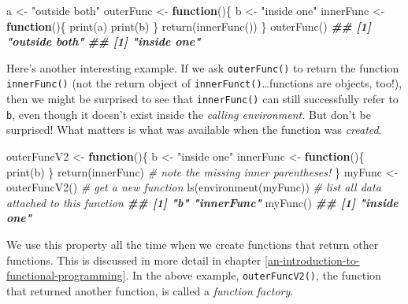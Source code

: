\documentclass[
  12pt,
  krantz2]{krantz}
\makeatletter
\newenvironment{Shaded}{\begin{snugshade}}{\end{snugshade}}
\newcommand{\CommentTok}[1]{\textcolor[rgb]{0.37,0.37,0.37}{\textit{#1}}}
\newcommand{\ControlFlowTok}[1]{\textcolor[rgb]{0.27,0.27,0.27}{\textbf{#1}}}
\newcommand{\DocumentationTok}[1]{\textcolor[rgb]{0.37,0.37,0.37}{\textbf{\textit{#1}}}}
\newcommand{\FunctionTok}[1]{\textcolor[rgb]{0,0,0}{#1}}
\newcommand{\NormalTok}[1]{#1}
\newcommand{\OtherTok}[1]{\textcolor[rgb]{0.37,0.37,0.37}{#1}}
\newcommand{\StringTok}[1]{\textcolor[rgb]{0.5,0.5,0.5}{#1}}
\newenvironment{kframe}{%
\medskip{}
\setlength{\fboxsep}{.8em}
 \def\at@end@of@kframe{}%
 \ifinner\ifhmode%
  \def\at@end@of@kframe{\end{minipage}}%
  \begin{minipage}{\columnwidth}%
 \fi\fi%
 \def\FrameCommand##1{\hskip\@totalleftmargin \hskip-\fboxsep
 \colorbox{shadecolor}{##1}\hskip-\fboxsep
     \hskip-\linewidth \hskip-\@totalleftmargin \hskip\columnwidth}%
 \MakeFramed {\advance\hsize-\width
   \@totalleftmargin\z@ \linewidth\hsize
   \@setminipage}}%
 {\par\unskip\endMakeFramed%
 \at@end@of@kframe}
\renewenvironment{Shaded}{\begin{kframe}}{\end{kframe}}
\makeatother
\begin{document}
\begin{Shaded}
\begin{Highlighting}[]
\NormalTok{a }\OtherTok{\textless{}{-}} \StringTok{"outside both"}
\NormalTok{outerFunc }\OtherTok{\textless{}{-}} \ControlFlowTok{function}\NormalTok{()\{}
\NormalTok{  b }\OtherTok{\textless{}{-}} \StringTok{"inside one"}
\NormalTok{  innerFunc }\OtherTok{\textless{}{-}} \ControlFlowTok{function}\NormalTok{()\{}
    \FunctionTok{print}\NormalTok{(a) }
    \FunctionTok{print}\NormalTok{(b)}
\NormalTok{  \}}
  \FunctionTok{return}\NormalTok{(}\FunctionTok{innerFunc}\NormalTok{())}
\NormalTok{\}}
\FunctionTok{outerFunc}\NormalTok{()}
\DocumentationTok{\#\# [1] "outside both"}
\DocumentationTok{\#\# [1] "inside one"}
\end{Highlighting}
\end{Shaded}

Here's another interesting example. If we ask \texttt{outerFunc()} to return the function \texttt{innerFunc()} (not the return object of \texttt{innerFunct()}\ldots functions are objects, too!), then we might be surprised to see that \texttt{innerFunc()} can still successfully refer to \texttt{b}, even though it doesn't exist inside the \emph{calling environment.} But don't be surprised! What matters is what was available when the function was \emph{created}.

\begin{Shaded}
\begin{Highlighting}[]
\NormalTok{outerFuncV2 }\OtherTok{\textless{}{-}} \ControlFlowTok{function}\NormalTok{()\{}
\NormalTok{  b }\OtherTok{\textless{}{-}} \StringTok{"inside one"}
\NormalTok{  innerFunc }\OtherTok{\textless{}{-}} \ControlFlowTok{function}\NormalTok{()\{}
    \FunctionTok{print}\NormalTok{(b)}
\NormalTok{  \}}
  \FunctionTok{return}\NormalTok{(innerFunc) }\CommentTok{\# note the missing inner parentheses!}
\NormalTok{\}}
\NormalTok{myFunc }\OtherTok{\textless{}{-}} \FunctionTok{outerFuncV2}\NormalTok{() }\CommentTok{\# get a new function}
\FunctionTok{ls}\NormalTok{(}\FunctionTok{environment}\NormalTok{(myFunc)) }\CommentTok{\# list all data attached to this function}
\DocumentationTok{\#\# [1] "b"         "innerFunc"}
\FunctionTok{myFunc}\NormalTok{()}
\DocumentationTok{\#\# [1] "inside one"}
\end{Highlighting}
\end{Shaded}

We use this property all the time when we create functions that return other functions. This is discussed in more detail in chapter \ref{an-introduction-to-functional-programming}. In the above example, \texttt{outerFuncV2()}, the function that returned another function, is called a \emph{function factory}.
\end{document}
